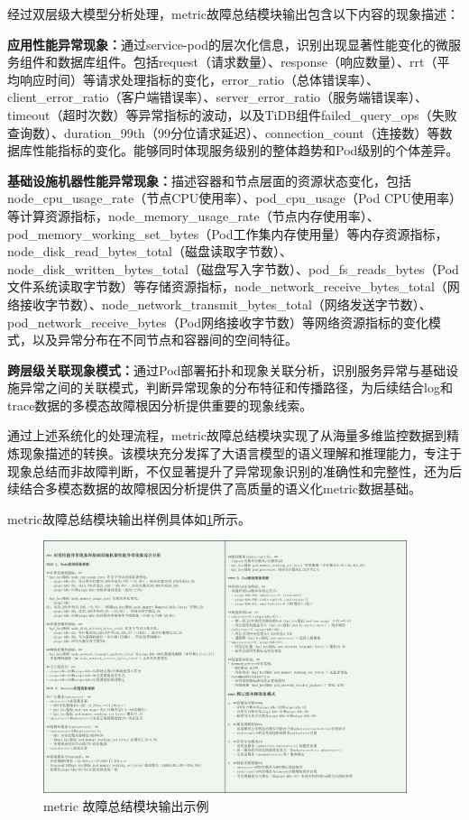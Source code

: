 \documentclass[11pt]{article}
\begin{document}
经过双层级大模型分析处理，metric故障总结模块输出包含以下内容的现象描述：

\textbf{应用性能异常现象：}通过service-pod的层次化信息，识别出现显著性能变化的微服务组件和数据库组件。包括request（请求数量）、response（响应数量）、rrt（平均响应时间）等请求处理指标的变化，error\_ratio（总体错误率）、client\_error\_ratio（客户端错误率）、server\_error\_ratio（服务端错误率）、timeout（超时次数）等异常指标的波动，以及TiDB组件failed\_query\_ops（失败查询数）、duration\_99th（99分位请求延迟）、connection\_count（连接数）等数据库性能指标的变化。能够同时体现服务级别的整体趋势和Pod级别的个体差异。

\textbf{基础设施机器性能异常现象：}描述容器和节点层面的资源状态变化，包括node\_cpu\_usage\_rate（节点CPU使用率）、pod\_cpu\_usage（Pod CPU使用率）等计算资源指标，node\_memory\_usage\_rate（节点内存使用率）、pod\_memory\_working\_set\_bytes（Pod工作集内存使用量）等内存资源指标，node\_disk\_read\_bytes\_total（磁盘读取字节数）、node\_disk\_written\_bytes\_total（磁盘写入字节数）、pod\_fs\_reads\_bytes（Pod文件系统读取字节数）等存储资源指标，node\_network\_receive\_bytes\_total（网络接收字节数）、node\_network\_transmit\_bytes\_total（网络发送字节数）、pod\_network\_receive\_bytes（Pod网络接收字节数）等网络资源指标的变化模式，以及异常分布在不同节点和容器间的空间特征。

\textbf{跨层级关联现象模式：}通过Pod部署拓扑和现象关联分析，识别服务异常与基础设施异常之间的关联模式，判断异常现象的分布特征和传播路径，为后续结合log和trace数据的多模态故障根因分析提供重要的现象线索。

通过上述系统化的处理流程，metric故障总结模块实现了从海量多维监控数据到精炼现象描述的转换。该模块充分发挥了大语言模型的语义理解和推理能力，专注于现象总结而非故障判断，不仅显著提升了异常现象识别的准确性和完整性，还为后续结合多模态数据的故障根因分析提供了高质量的语义化metric数据基础。

metric故障总结模块输出样例具体如\ref{fig17}所示。

\begin{figure}[htbp]
    \centering
    \includegraphics[width=0.95\textwidth]{pics/fig17.png}
    \caption{metric 故障总结模块输出示例}
    \label{fig17}
\end{figure}
\end{document}
